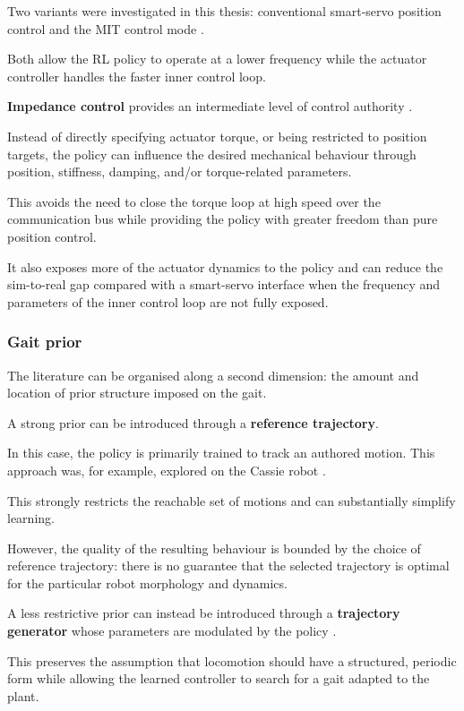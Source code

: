 Two variants were investigated in this thesis: conventional smart-servo position control and the MIT control mode \cite{katz2019minicheetah}.

Both allow the RL policy to operate at a lower frequency while the actuator controller handles the faster inner control loop.

\textbf{Impedance control} provides an intermediate level of control authority \cite{bogdanovic2020impedance}.

Instead of directly specifying actuator torque, or being restricted to position targets, the policy can influence the desired mechanical behaviour through position, stiffness, damping, and/or torque-related parameters.

This avoids the need to close the torque loop at high speed over the communication bus while providing the policy with greater freedom than pure position control.

It also exposes more of the actuator dynamics to the policy and can reduce the sim-to-real gap compared with a smart-servo interface when the frequency and parameters of the inner control loop are not fully exposed.

\subsubsection{Gait prior}

The literature can be organised along a second dimension: the amount and location of prior structure imposed on the gait.

A strong prior can be introduced through a \textbf{reference trajectory}.

In this case, the policy is primarily trained to track an authored motion. This approach was, for example, explored on the Cassie robot \cite{xie2019}.

This strongly restricts the reachable set of motions and can substantially simplify learning.

However, the quality of the resulting behaviour is bounded by the choice of reference trajectory: there is no guarantee that the selected trajectory is optimal for the particular robot morphology and dynamics.

A less restrictive prior can instead be introduced through a \textbf{trajectory generator} whose parameters are modulated by the policy \cite{pmtg2018}.

This preserves the assumption that locomotion should have a structured, periodic form while allowing the learned controller to search for a gait adapted to the plant.

